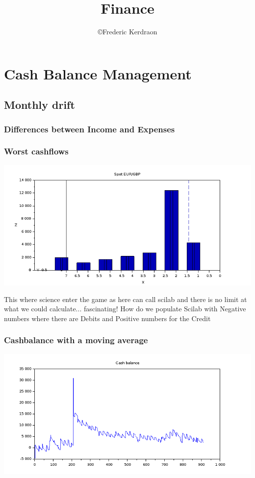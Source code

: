 \documentclass[8pt]{article} %
\title{Finance}
\author{\copyright Frederic Kerdraon}
\begin{document}
\maketitle
\tableofcontents

\section{Cash Balance Management}

\subsection{Monthly drift}

\subsubsection{Differences between Income and Expenses}
%
%


\subsubsection{Worst cashflows}
\includegraphics[scale=0.6]{Vector.png}

This where science enter the game as here can call scilab and there is no limit at what we could calculate... fascinating!
How do we populate Scilab with Negative numbers where there are Debits and Positive numbers for the Credit
\subsubsection{Cashbalance with a moving average}
\includegraphics[scale=0.6]{../Maths/Scilab-cashBalance.png}
\end{document}
